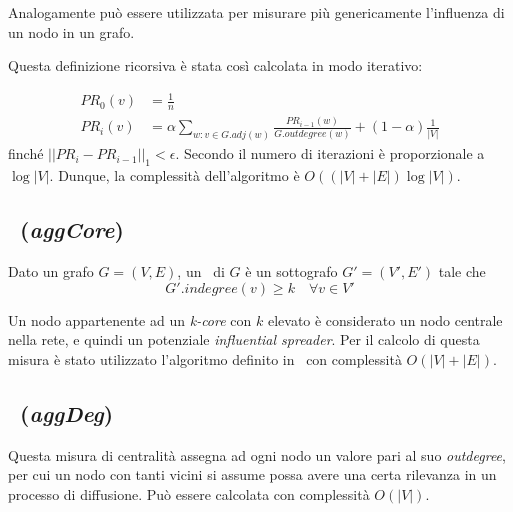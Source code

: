 Analogamente può essere utilizzata per misurare più genericamente l'influenza di un nodo 
in un grafo.

Questa definizione ricorsiva è stata così calcolata in modo iterativo: 

\begin{equation}
    \begin{split}
PR_0(v)&= \frac{1}{n}\\
PR_i(v)&= \alpha \sum_{w : v \in G.adj(w)} 
\frac{PR_{i-1}(w)}{G.outdegree(w)} + 
(1-\alpha)\frac{1}{|V|}
    \end{split}
\end{equation}
finché $||PR_{i} - PR_{i-1}||_1 < \epsilon$. Secondo \cite{page:pagerank} il numero di iterazioni 
è proporzionale a $\log{|V|}$. Dunque, la complessità dell'algoritmo è $O((|V| + |E|)\log{|V|})$.


\subsection{\kcore~(\textit{aggCore})}
\begin{definizione}[\kcore]
    \label{def:kcore}
    Dato un grafo $G=(V, E)$, un \kcore\ di $G$ è un sottografo $G'=(V',E')$
    tale che 
    \begin{equation}
        G'.indegree(v) \geq k \quad \forall v \in V'
    \end{equation}
\end{definizione}

Un nodo appartenente ad un \textit{k-core} con $k$ elevato è considerato un nodo centrale 
nella rete, e quindi un potenziale \textit{influential spreader}.
Per il calcolo di questa misura è stato utilizzato l'algoritmo definito in~\cite{batagelj:kcore}
con complessità $O(|V| + |E|)$.

\subsection{\degree~(\textit{aggDeg})}
Questa misura di centralità assegna ad ogni nodo un valore pari al suo \textit{outdegree}, 
per cui un nodo con tanti vicini si assume possa avere una certa rilevanza in un 
processo di diffusione.
Può essere calcolata con complessità $O(|V|)$.

